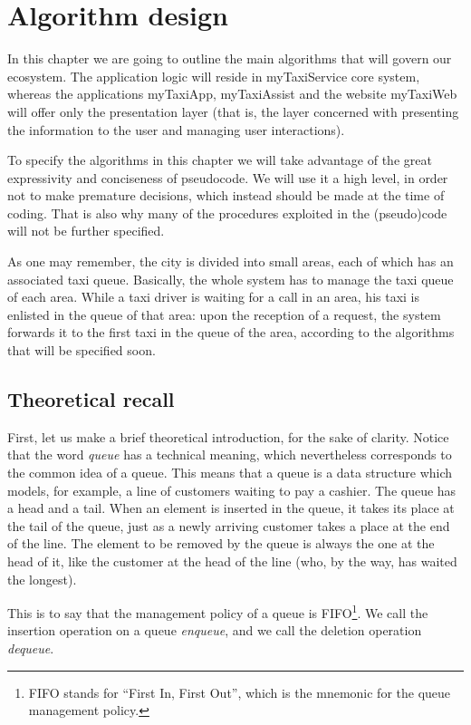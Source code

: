 \chapter{Algorithm design} \label{chap:algorithm}
In this chapter we are going to outline the main algorithms that will govern our ecosystem. The application logic will reside in myTaxiService core system, whereas the applications myTaxiApp, myTaxiAssist and the website myTaxiWeb will offer only the presentation layer (that is, the layer concerned with presenting the information to the user and managing user interactions). 

To specify the algorithms in this chapter we will take advantage of the great expressivity and conciseness of pseudocode. We will use it a high level, in order not to make premature decisions, which instead should be made at the time of coding. That is also why many of the procedures exploited in the (pseudo)code will not be further specified.

As one may remember, the city is divided into small areas, each of which has an associated taxi queue. Basically, the whole system has to manage the taxi queue of each area. While a taxi driver is waiting for a call in an area, his taxi is enlisted in the queue of that area: upon the reception of a request, the system forwards it to the first taxi in the queue of the area, according to the algorithms that will be specified soon.


\section{Theoretical recall}
First, let us make a brief theoretical introduction, for the sake of clarity. Notice that the word \emph{queue} has a technical meaning, which nevertheless corresponds to the common idea of a queue. This means that a queue is a data structure which models, for example, a line of customers waiting to pay a cashier. The queue has a head and a tail. When an element is inserted in the queue, it takes its place at the tail of the queue, just as a newly arriving customer takes a place at the end of the line. The element to be removed by the queue is always the one at the head of it, like the customer at the head of the line (who, by the way, has waited the longest).

This is to say that the management policy of a queue is FIFO\footnote{FIFO stands for ``First In, First Out'', which is the mnemonic for the queue management policy.}. We call the insertion operation on a queue \emph{enqueue}, and we call the deletion operation \emph{dequeue}.

